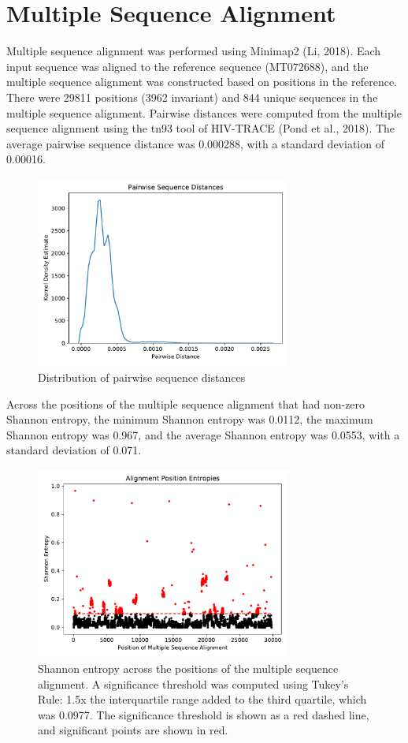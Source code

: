 \documentclass{article}
\begin{document}
\section{Multiple Sequence Alignment}
Multiple sequence alignment was performed using Minimap2 (Li, 2018). Each input sequence was aligned to the reference sequence (MT072688), and the multiple sequence alignment was constructed based on positions in the reference. There were 29811 positions (3962 invariant) and 844 unique sequences in the multiple sequence alignment. Pairwise distances were computed from the multiple sequence alignment using the tn93 tool of HIV-TRACE (Pond et al., 2018). The average pairwise sequence distance was 0.000288, with a standard deviation of 0.00016.

\begin{figure}[h]
\centering
\includegraphics[width=0.75\textwidth,keepaspectratio]{./figs/pairwise_distances_sequences.pdf}
\caption{Distribution of pairwise sequence distances}
\end{figure}

 Across the positions of the multiple sequence alignment that had non-zero Shannon entropy, the minimum Shannon entropy was 0.0112, the maximum Shannon entropy was 0.967, and the average Shannon entropy was 0.0553, with a standard deviation of 0.071.

\begin{figure}[h]
\centering
\includegraphics[width=0.75\textwidth,keepaspectratio]{./figs/alignment_entropies.pdf}
\caption{Shannon entropy across the positions of the multiple sequence alignment. A significance threshold was computed using Tukey's Rule: 1.5x the interquartile range added to the third quartile, which was 0.0977. The significance threshold is shown as a red dashed line, and significant points are shown in red.}
\end{figure}
\end{document}
